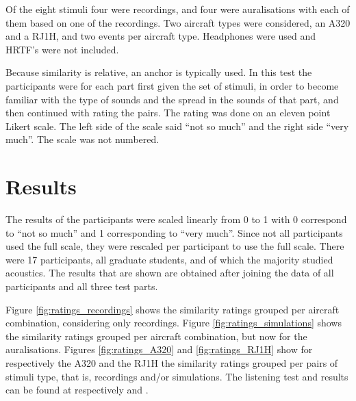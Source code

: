 Of the eight stimuli four were recordings, and four were auralisations with each
of them based on one of the recordings. Two aircraft types were considered, an
A320 and a RJ1H, and two events per aircraft type.
Headphones were used and HRTF's were not included.

Because similarity is relative, an anchor is typically used. In this test the
participants were for each part first given the set of stimuli, in order to
become familiar with the type of sounds and the spread in the sounds of that
part, and then continued with rating the pairs. The rating was done on an eleven
point Likert scale. The left side of the scale said ``not so much'' and the right
side ``very much''. The scale was not numbered.


\section{Results}
The results of the participants were scaled linearly from 0 to 1 with 0
correspond to ``not so much'' and 1 corresponding to ``very much''. Since not
all participants used the full scale, they were rescaled per participant to use
the full scale. There were 17 participants, all graduate students, and of which
the majority studied acoustics. The results that are shown are obtained after
joining the data of all participants and all three test parts.

Figure \ref{fig:ratings_recordings} shows the similarity ratings grouped per
aircraft combination, considering only recordings. Figure
\ref{fig:ratings_simulations} shows the similarity ratings grouped per
aircraft combination, but now for the auralisations.
Figures \ref{fig:ratings_A320} and \ref{fig:ratings_RJ1H} show
for respectively the A320 and the RJ1H the similarity ratings grouped per pairs
of stimuli type, that is, recordings and/or simulations.
The listening test and results can be found at respectively \cite{Rietdijk2017a} and \cite{Rietdijk2017b}.



